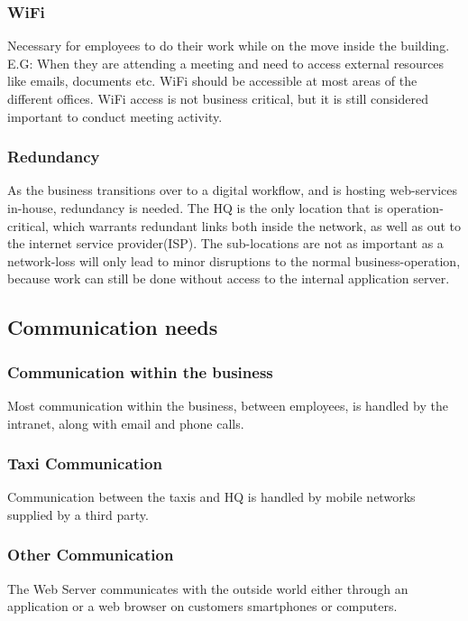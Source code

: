 \subsubsection{WiFi}
\vspace{-0.6em}
Necessary for employees to do their work while on the move inside the building. 
E.G: When they are attending a meeting and need to access external resources like emails, documents etc.
WiFi should be accessible at most areas of the different offices.
WiFi access is not business critical, but it is still considered important to conduct meeting activity.

\subsubsection{Redundancy}
\vspace{-0.6em}
As the business transitions over to a digital workflow, and is hosting web-services in-house, redundancy is needed.
The HQ is the only location that is operation-critical, which warrants redundant links both inside the network, as well as out to the internet service provider(ISP). 
The sub-locations are not as important as a network-loss will only lead to minor disruptions to the normal business-operation, because work can still be done without access to the internal application server.

\subsection{Communication needs}

\subsubsection*{Communication within the business}
\vspace{-0.6em}
Most communication within the business, between employees, is handled by the intranet, along with email and phone calls.

\subsubsection*{Taxi Communication}
\vspace{-0.6em}
Communication between the taxis and HQ is handled by mobile networks supplied by a third party.

\subsubsection*{Other Communication} %
\vspace{-0.6em}
The Web Server communicates with the outside world either through an application or a web browser on customers smartphones or computers.

